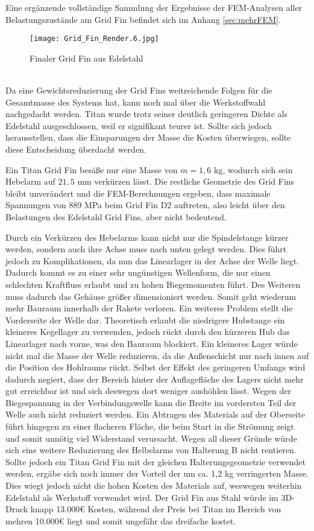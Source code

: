 Eine ergänzende vollständige Sammlung der Ergebnisse der FEM-Analysen aller Belastungszustände am Grid Fin befindet sich im Anhang \ref{sec:mehrFEM}.
\begin{figure}[h] 
	\centering
	\texttt{[image: Grid\_Fin\_Render.6.jpg]}
	\caption{Finaler Grid Fin aus Edelstahl}
	\label{abb_rendering1}
\end{figure}\\
Da eine Gewichtsreduzierung der Grid Fins weitreichende Folgen für die Gesamtmasse des Systems hat, kann noch mal über die Werkstoffwahl nachgedacht werden. Titan wurde trotz seiner deutlich geringeren Dichte als Edelstahl ausgeschlossen, weil er signifikant teurer ist. Sollte sich jedoch herausstellen, dass die Einsparungen der Masse die Kosten überwiegen, sollte diese Entscheidung überdacht werden.

Ein Titan Grid Fin besäße nur eine Masse von $m=1,6$ kg, wodurch sich sein Hebelarm auf $21,5$ mm verkürzen lässt. Die restliche Geometrie des Grid Fins bleibt unverändert und die FEM-Berechnungen ergeben, dass maximale Spannungen von $889$ MPa beim Grid Fin D2 auftreten, also leicht über den Belastungen des Edelstahl Grid Fins, aber nicht bedeutend.

Durch ein Verkürzen des Hebelarms kann nicht nur die Spindelstange kürzer werden, sondern auch ihre Achse muss nach unten gelegt werden. Dies führt jedoch zu Komplikationen, da nun das Linearlager in der Achse der Welle liegt. Dadurch kommt es zu einer sehr ungünstigen Wellenform, die nur einen schlechten Kraftfluss erlaubt und zu hohen Biegemomenten führt. Des Weiteren muss dadurch das Gehäuse größer dimensioniert werden. Somit geht wiederum mehr Bauraum innerhalb der Rakete verloren. Ein weiteres Problem stellt die Vorderseite der Welle dar. Theoretisch erlaubt die niedrigere Hubstange ein kleineres Kegellager zu verwenden, jedoch rückt durch den kürzeren Hub das Linearlager nach vorne, was den Bauraum blockiert. Ein kleineres Lager würde nicht mal die Masse der Welle reduzieren, da die Außenschicht nur nach innen auf die Position des Hohlraums rückt. Selbst der Effekt des geringeren Umfangs wird dadurch negiert, dass der Bereich hinter der Auflagefläche des Lagers nicht mehr gut erreichbar ist und sich deswegen dort weniger aushöhlen lässt. Wegen der Biegespannung in der Verbindungswelle kann die Breite im vordersten Teil der Welle auch nicht reduziert werden. Ein Abtragen des Materials auf der Oberseite führt hingegen zu einer flacheren Fläche, die beim Start in die Strömung zeigt und somit unnötig viel Widerstand verursacht. Wegen all dieser Gründe würde sich eine weitere Reduzierung des Helbelarms von Halterung B nicht rentieren. Sollte jedoch ein Titan Grid Fin mit der gleichen Halterungsgeometrie verwendet werden, ergäbe sich noch immer der Vorteil der um ca. 1,2 kg verringerten Masse. Dies wiegt jedoch nicht die hohen Kosten des Materials auf, weswegen weiterhin Edelstahl als Werkstoff verwendet wird. Der Grid Fin aus Stahl würde im 3D-Druck knapp 13.000€ Kosten, während der Preis bei Titan im Bereich von mehren 10.000€ liegt und somit ungefähr das dreifache kostet.
